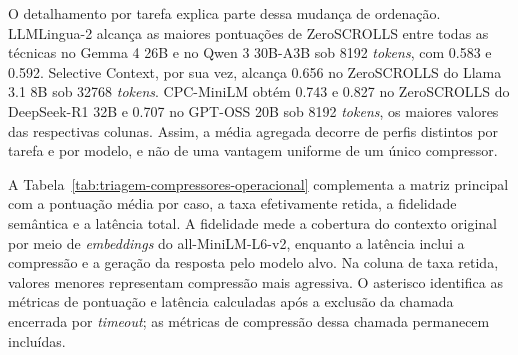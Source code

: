 O detalhamento por tarefa explica parte dessa mudança de ordenação. LLMLingua-2 alcança as maiores pontuações de ZeroSCROLLS entre todas as técnicas no Gemma 4 26B e no Qwen 3 30B-A3B sob 8192 \textit{tokens}, com 0.583 e 0.592. Selective Context, por sua vez, alcança 0.656 no ZeroSCROLLS do Llama 3.1 8B sob 32768 \textit{tokens}. CPC-MiniLM obtém 0.743 e 0.827 no ZeroSCROLLS do DeepSeek-R1 32B e 0.707 no GPT-OSS 20B sob 8192 \textit{tokens}, os maiores valores das respectivas colunas. Assim, a média agregada decorre de perfis distintos por tarefa e por modelo, e não de uma vantagem uniforme de um único compressor.

A Tabela~\ref{tab:triagem-compressores-operacional} complementa a matriz principal com a pontuação média por caso, a taxa efetivamente retida, a fidelidade semântica e a latência total. A fidelidade mede a cobertura do contexto original por meio de \textit{embeddings} do all-MiniLM-L6-v2, enquanto a latência inclui a compressão e a geração da resposta pelo modelo alvo. Na coluna de taxa retida, valores menores representam compressão mais agressiva. O asterisco identifica as métricas de pontuação e latência calculadas após a exclusão da chamada encerrada por \textit{timeout}; as métricas de compressão dessa chamada permanecem incluídas.

